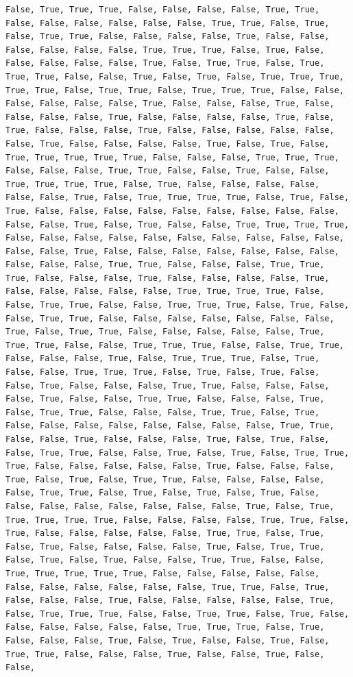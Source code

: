 \documentclass[
  letterpaper,
  DIV=11,
  numbers=noendperiod]{scrartcl}
\begin{document}
\begin{verbatim}
False, True, True, True, False, False, False, False, True, True, False, False, False, False, False, False, True, True, False, True, False, True, True, False, False, False, False, True, False, False, False, False, False, False, True, True, True, False, True, False, False, False, False, False, True, False, True, True, False, True, True, True, False, False, True, False, True, False, True, True, True, True, True, False, True, True, False, True, True, True, False, False, False, False, False, False, True, False, False, False, True, False, False, False, False, True, False, False, False, False, True, False, True, False, False, False, True, False, False, False, False, False, False, True, False, False, False, False, True, False, True, False, True, True, True, True, True, False, False, False, True, True, True, False, False, False, True, True, False, False, True, False, False, True, True, True, True, False, True, False, False, False, False, False, False, True, False, True, True, True, True, False, True, False, True, False, False, False, False, False, False, False, False, False, False, False, True, False, True, False, False, True, True, True, True, False, False, False, False, False, False, False, False, False, False, False, False, True, False, False, False, False, False, False, False, False, False, False, True, True, False, False, False, True, True, True, False, False, False, True, False, False, False, False, True, False, False, False, False, False, True, True, True, True, False, False, True, True, False, False, True, True, True, False, True, False, False, True, True, False, False, False, False, False, False, False, True, False, True, True, False, False, False, False, False, True, True, True, False, False, True, True, True, False, False, True, True, False, False, False, True, False, True, True, True, False, True, False, False, True, True, True, False, True, False, True, False, False, True, False, False, False, True, True, False, False, False, False, True, False, False, True, True, False, False, False, True, False, True, True, False, False, False, True, True, False, True, False, False, False, False, False, False, False, False, True, True, False, False, True, False, False, False, True, False, True, False, False, True, True, False, False, True, False, True, False, True, True, True, False, False, False, False, False, True, False, False, False, True, False, True, False, True, True, False, False, False, False, False, True, True, False, True, False, True, False, True, False, False, False, False, False, False, False, False, True, False, True, True, True, True, True, False, False, False, False, True, True, False, True, False, False, False, False, False, True, True, False, True, False, True, False, False, False, False, True, False, True, True, False, True, False, True, False, False, True, True, False, False, True, True, True, True, True, False, False, False, False, False, False, False, False, False, False, False, True, True, False, True, False, False, False, True, False, False, False, False, False, True, False, True, True, True, False, False, True, True, False, True, False, False, False, False, False, False, True, True, True, False, True, False, False, False, True, False, True, False, False, True, False, True, True, False, False, False, True, False, False, True, False, False, 
\end{verbatim}
\end{document}
